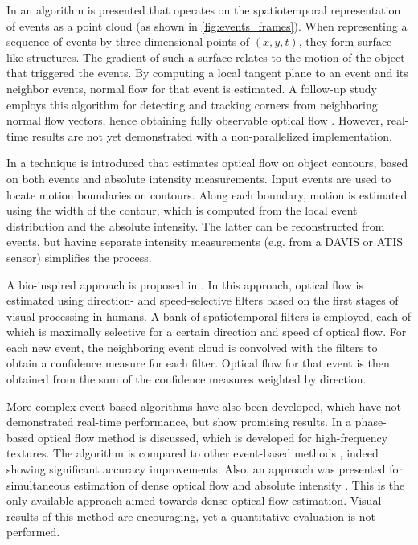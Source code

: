 In \citet{Benosman2014} an algorithm is presented that operates on the spatiotemporal representation of events as a point cloud (as shown in \cref{fig:events_frames}). When representing a sequence of events by three-dimensional points of $(x,y,t)$, they form surface-like structures. The gradient of such a surface relates to the motion of the object that triggered the events. By computing a local tangent plane to an event and its neighbor events, normal flow for that event is estimated. A follow-up study employs this algorithm for detecting and tracking corners from neighboring normal flow vectors, hence obtaining fully observable optical flow \cite{Clady2015}. However, real-time results are not yet demonstrated with a non-parallelized implementation.
%
%

In \cite{Barranco2014} a technique is introduced that estimates optical flow on object contours, based on both events and absolute intensity measurements. Input events are used to locate motion boundaries on contours. Along each boundary, motion is estimated using the width of the contour, which is computed from the local event distribution and the absolute intensity. The latter can be reconstructed from events, but having separate intensity measurements (e.g. from a DAVIS or ATIS sensor) simplifies the process.

A bio-inspired approach is proposed in \citet{Brosch2015}. In this approach, optical flow is estimated using direction- and speed-selective filters based on the first stages of visual processing in humans. A bank of spatiotemporal filters is employed, each of which is maximally selective for a certain direction and speed of optical flow. For each new event, the neighboring event cloud is convolved with the filters to obtain a confidence measure for each filter. Optical flow for that event is then obtained from the sum of the confidence measures weighted by direction.

More complex event-based algorithms have also been developed, which have not demonstrated real-time performance, but show promising results. In \citet{Barranco2015} a phase-based optical flow method is discussed, which is developed for high-frequency textures. The algorithm is compared to other event-based methods \cite{Benosman2012,Benosman2014,Barranco2014}, indeed showing significant accuracy improvements. Also, an approach was presented for simultaneous estimation of dense optical flow and absolute intensity \cite{Bardow2016}. This is the only available approach aimed towards dense optical flow estimation. Visual results of this method are encouraging, yet a quantitative evaluation is not performed.

